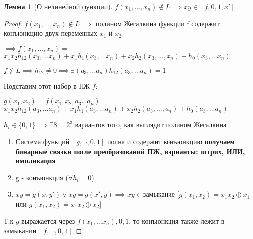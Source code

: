 \documentclass[a4paper]{article}
\newtheorem{lemma}{Лемма}[section]
\theoremstyle{definition}
\theoremstyle{remark}
\begin{document}
    \begin{lemma}[О нелинейной функции]
        $f(x_1, \dots, x_n) \notin L \implies xy \in [f, 0, 1, x']$
    \end{lemma}
    \begin{proof}
        $f(x_1, \dots, x_n) \notin L\implies$ полином Жегалкина функции f содержит конъюнкцию двух переменных $x_1$ и $x_2$
    
        $\implies f(x_1, \dots, x_n)=$
        $x_1x_2h_{12}(x_3, \dots x_n) + x_1h_1(x_3, \dots x_n) + x_2 h_2 (x_3, \dots, x_n) + h_0(x_3, \dots x_n)$
        
        $f\notin L \implies h_{12}\neq 0 \implies \exists (a_3, \dots a_n) h_{12} (a_3, \dots a_n) = 1$

        Подставим этот набор в ПЖ $f$:

        $g(x_1, x_2) = f(x_1, x_2, a_3\dots  a_n) = $
        $x_1x_2h_{12}(a_3, \dots a_n) + x_1h_1(a_3, \dots a_n) + x_2 h_2 (a_3, \dots, a_n) + h_0(a_3, \dots a_n)$

        $h_i\in \{0, 1\}\implies \exists 8 =2^3$ вариантов того, как выглядит полином Жегалкина

        \begin{enumerate}
            \item Система функций $[g, \neg, 0, 1]$ полна и содержит конъюнкцию \textbf{получаем бинарные связки после преобразований ПЖ, варианты: штрих, ИЛИ, импликация}
            \item g - конъюнкция ($\forall h_i = 0$)
            \item $xy = g(x, y') \vee xy = g(x', y)\implies xy \in $замыкание $[g(x_1, x_2) = x_1 x_2 \oplus x_1$ или $g(x_1, x_2) = x_1 x_2 \oplus x_2]$ 
        \end{enumerate}
        Т.к $g$ выражается через $f(x_1, \dots x_n), 0, 1$, то конъюнкция также лежит в замыкании $[f, \neg, 0, 1]$

    \end{proof}
\end{document}
